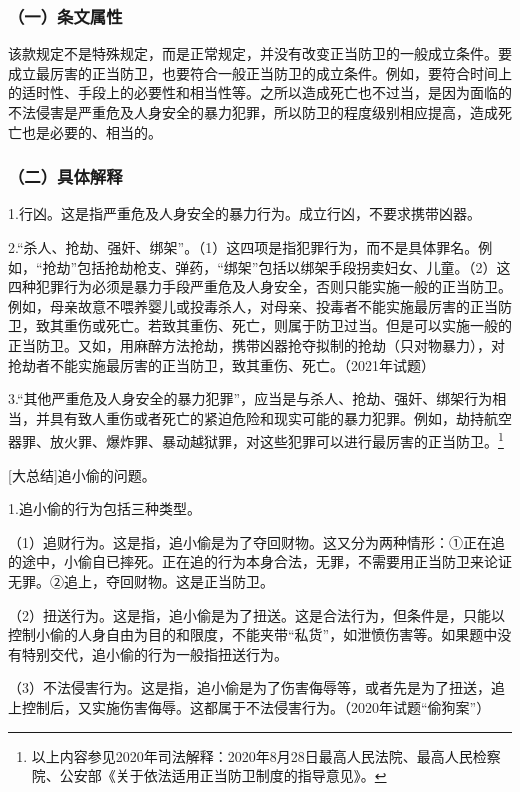 \subsubsection*{（一）条文属性}

该款规定不是特殊规定，而是正常规定，并没有改变正当防卫的一般成立条件。要成立最厉害的正当防卫，也要符合一般正当防卫的成立条件。例如，要符合时间上的适时性、手段上的必要性和相当性等。之所以造成死亡也不过当，是因为面临的不法侵害是严重危及人身安全的暴力犯罪，所以防卫的程度级别相应提高，造成死亡也是必要的、相当的。

\subsubsection*{（二）具体解释}

1.行凶。这是指严重危及人身安全的暴力行为。成立行凶，不要求携带凶器。

2.“杀人、抢劫、强奸、绑架”。（1）这四项是指犯罪行为，而不是具体罪名。例如，“抢劫”包括抢劫枪支、弹药，“绑架”包括以绑架手段拐卖妇女、儿童。（2）这四种犯罪行为必须是暴力手段严重危及人身安全，否则只能实施一般的正当防卫。例如，母亲故意不喂养婴儿或投毒杀人，对母亲、投毒者不能实施最厉害的正当防卫，致其重伤或死亡。若致其重伤、死亡，则属于防卫过当。但是可以实施一般的正当防卫。又如，用麻醉方法抢劫，携带凶器抢夺拟制的抢劫（只对物暴力），对抢劫者不能实施最厉害的正当防卫，致其重伤、死亡。（2021年试题）

3.“其他严重危及人身安全的暴力犯罪”，应当是与杀人、抢劫、强奸、绑架行为相当，并具有致人重伤或者死亡的紧迫危险和现实可能的暴力犯罪。例如，劫持航空器罪、放火罪、爆炸罪、暴动越狱罪，对这些犯罪可以进行最厉害的正当防卫。\footnote{以上内容参见2020年司法解释：2020年8月28日最高人民法院、最高人民检察院、公安部《关于依法适用正当防卫制度的指导意见》。}

[大总结]追小偷的问题。

1.追小偷的行为包括三种类型。

（1）追财行为。这是指，追小偷是为了夺回财物。这又分为两种情形：①正在追的途中，小偷自已摔死。正在追的行为本身合法，无罪，不需要用正当防卫来论证无罪。②追上，夺回财物。这是正当防卫。

（2）扭送行为。这是指，追小偷是为了扭送。这是合法行为，但条件是，只能以控制小偷的人身自由为目的和限度，不能夹带“私货”，如泄愤伤害等。如果题中没有特别交代，追小偷的行为一般指扭送行为。

（3）不法侵害行为。这是指，追小偷是为了伤害侮辱等，或者先是为了扭送，追上控制后，又实施伤害侮辱。这都属于不法侵害行为。（2020年试题“偷狗案”）

